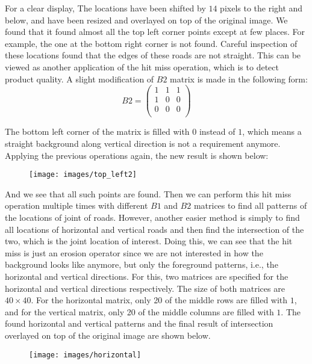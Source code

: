 \documentclass[conference]{styles/acmsiggraph}
\newenvironment{answer}{}{}
\begin{document}
\begin{answer}
	For a clear display, The locations have been shifted by $14$ pixels to the right and below, and have been resized and overlayed on top of the original image. We found that it found almost all the top left corner points except at few places. For example, the one at the bottom right corner is not found. Careful inspection of these locations found that the edges of these roads are not straight. This can be viewed as another application of the hit miss operation, which is to detect product quality. A slight modification of $B2$ matrix is made in the following form:
	$$B2 = \begin{pmatrix}
		1 & 1 & 1\\
		1 & 0 & 0\\
		0 & 0 & 0\\
	\end{pmatrix} $$

	The bottom left corner of the matrix is filled with $0$ instead of $1$, which means a straight background along vertical direction is not a requirement anymore. Applying the previous operations again, the new result is shown below:
	\begin{figure}[H]
		\centering
		\texttt{[image: images/top\_left2]}
		\end{figure}
	
	And we see that all such points are found. Then we can perform this hit miss operation multiple times with different $B1$ and $B2$ matrices to find all patterns of the locations of joint of roads. However, another easier method is simply to find all locations of horizontal and vertical roads and then find the intersection of the two, which is the joint location of interest. Doing this, we can see that the hit miss is just an erosion operator since we are not interested in how the background looks like anymore, but only the foreground patterns, i.e., the horizontal and vertical directions. For this, two matrices are specified for the horizontal and vertical directions respectively. The size of both matrices are $40\times40$. For the horizontal matrix, only 20 of the middle rows are filled with $1$, and for the vertical matrix,  only 20 of the middle columns are filled with $1$. The found horizontal and vertical patterns and the final result of intersection overlayed on top of the original image are shown below.

	\begin{figure}[H]
		\centering
		\texttt{[image: images/horizontal]}
		\end{figure}	


\end{answer}
\end{document}
